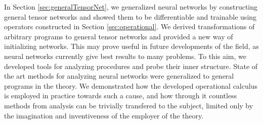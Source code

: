 \documentclass{article}
\begin{document}
In Section \ref{sec:generalTensorNet}, we generalized neural networks by constructing general tensor networks and showed them to be differentiable and trainable using operators constructed in Section \ref{sec:operational}. We derived transformations of arbitrary programs to general tensor networks and provided a new way of initializing networks. This may prove useful in future developments of the field, as neural networks currently give best results to many problems. To this aim, we developed tools for analyzing procedures and probe their inner structure.
State of the art methods for analyzing neural networks were generalized to general programs in the theory.
We demonstrated how the developed operational calculus is employed in practice towards such a cause, and how through it countless methods from analysis can be trivially transfered to the subject, limited only by the imagination and inventiveness of the employer of the theory.
  \printbibliography
\end{document}
